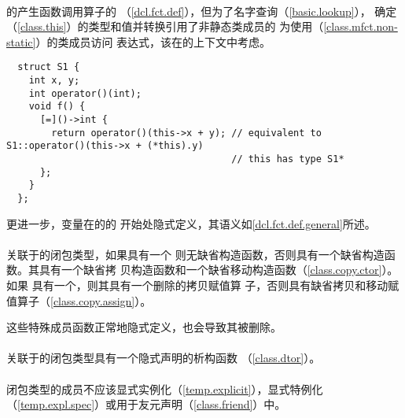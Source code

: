 \paragraph{} %
的产生函数调用算子的
（\ref{dcl.fct.def}），但为了名字查询（\ref{basic.lookup}），
确定（\ref{class.this}）的类型和值并转换引用了非静态类成员的
为使用（\ref{class.mfct.non-static}）的类成员访问
表达式，该在的上下文中考虑。

\begin{example}
  \begin{lstlisting}
  struct S1 {
    int x, y;
    int operator()(int);
    void f() {
      [=]()->int {
        return operator()(this->x + y); // equivalent to S1::operator()(this->x + (*this).y)
                                        // this has type S1*
      };
    }
  };
  \end{lstlisting}
\end{example}

更进一步，变量在的的
开始处隐式定义，其语义如\ref{dcl.fct.def.general}所述。

\paragraph{} %
关联于的闭包类型，如果具有一个
则无缺省构造函数，否则具有一个缺省构造函数。其具有一个缺省拷
贝构造函数和一个缺省移动构造函数（\ref{class.copy.ctor}）。如果
具有一个，则其具有一个删除的拷贝赋值算
子，否则具有缺省拷贝和移动赋值算子（\ref{class.copy.assign}）。

\begin{note}
  这些特殊成员函数正常地隐式定义，也会导致其被删除。
\end{note}

\paragraph{} %
关联于的闭包类型具有一个隐式声明的析构函数
（\ref{class.dtor}）。

\paragraph{} %
闭包类型的成员不应该显式实例化（\ref{temp.explicit}），显式特例化
（\ref{temp.expl.spec}）或用于友元声明（\ref{class.friend}）中。
